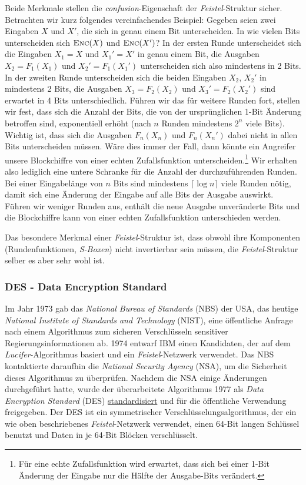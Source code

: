 Beide Merkmale stellen die \textit{confusion}-Eigenschaft der \textit{Feistel}-Struktur sicher. Betrachten wir kurz folgendes vereinfachendes Beispiel:
Gegeben seien zwei Eingaben $X$ und $X'$, die sich in genau einem Bit unterscheiden. In wie vielen Bits unterscheiden sich $\textsc{Enc}(X)$ und $\textsc{Enc}(X')$? 
In der ersten Runde unterscheidet sich die Eingaben $X_1 = X$ und $X_1' = X'$ in genau einem Bit, die Ausgaben $X_2 = F_1(X_1)$ und $X_2' = F_1(X_1')$ unterscheiden sich also mindestens in 2 Bits. In der zweiten Runde unterscheiden sich die beiden Eingaben $X_2$, $X_2'$ in mindestens 2 Bits, die Ausgaben $X_3 = F_2(X_2)$ und $X_3' = F_2(X_2')$ sind erwartet in 4 Bits unterschiedlich. Führen wir das für weitere Runden fort, stellen wir fest, dass sich die Anzahl der Bits, die von der ursprünglichen 1-Bit Änderung betroffen sind, exponentiell erhöht (nach $n$ Runden mindestens $2^n$ viele Bits).
Wichtig ist, dass sich die Ausgaben $F_n(X_n)$ und $F_n(X_n')$ dabei nicht in allen Bits unterscheiden müssen. Wäre dies immer der Fall, dann könnte ein Angreifer unsere Blockchiffre von einer echten Zufallsfunktion unterscheiden.\footnote{Für eine echte Zufallsfunktion wird erwartet, dass sich bei einer 1-Bit Änderung der Eingabe nur die Hälfte der Ausgabe-Bits verändert.} Wir erhalten also lediglich eine untere Schranke für die Anzahl der durchzuführenden Runden. Bei einer Eingabelänge von $n$ Bits sind mindestens $ \lceil \log n \rceil$ viele Runden nötig, damit sich eine Änderung der Eingabe auf alle Bits der Ausgabe auswirkt. Führen wir weniger Runden aus, enthält die neue Ausgabe unveränderte Bits und die Blockchiffre kann von einer echten Zufallsfunktion unterschieden werden.


Das besondere Merkmal einer \textit{Feistel}-Struktur ist, dass obwohl ihre Komponenten (Rundenfunktionen, \textit{S-Boxen}) nicht invertierbar sein müssen, die \textit{Feistel}-Struktur selber es aber sehr wohl ist.

\subsubsection{DES - Data Encryption Standard}
\label{sssec:des}

Im Jahr 1973 gab das \textit{National Bureau of Standards} (NBS) der USA, das heutige \textit{National Institute of Standards and Technology} (NIST), eine öffentliche Anfrage nach einem Algorithmus zum sicheren Verschlüsseln sensitiver Regierungsinformationen ab. 1974 entwarf IBM einen Kandidaten, der auf dem \textit{Lucifer}-Algorithmus basiert und ein \textit{Feistel}-Netzwerk verwendet. Das NBS kontaktierte daraufhin die \textit{National Security Agency} (NSA), um die Sicherheit dieses Algorithmus zu überprüfen. Nachdem die NSA einige Änderungen durchgeführt hatte, wurde der überarbeitete Algorithmus 1977 als \textit{Data Encryption Standard} (DES) \href{http://csrc.nist.gov/publications/fips/archive/fips46-3/fips46-3.pdf}{standardisiert} und für die öffentliche Verwendung freigegeben. Der DES ist ein symmetrischer Verschlüsselungsalgorithmus, der ein wie oben beschriebenes \textit{Feistel}-Netzwerk verwendet, einen 64-Bit langen Schlüssel benutzt und Daten in je 64-Bit Blöcken verschlüsselt. 

